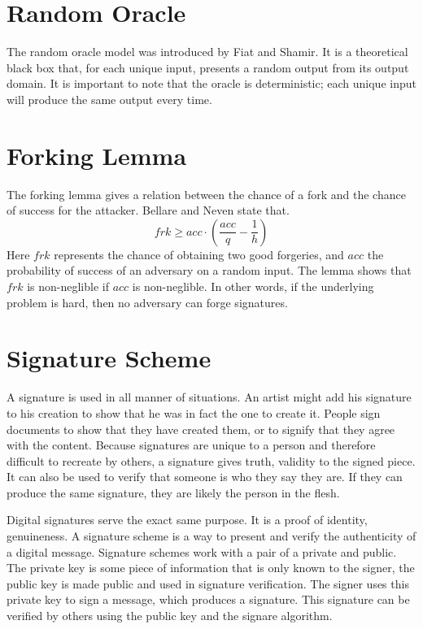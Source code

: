 \section{Random Oracle}
The random oracle model \cite{Oracle} was introduced by Fiat and Shamir. It is a theoretical black box that, for each unique input, presents a random output from its output domain. It is important to note that the oracle is deterministic; each unique input will produce the same output every time.

\section{Forking Lemma}
The forking lemma \cite{Forking} gives a relation between the chance of a fork and the chance of success for the attacker. Bellare and Neven state that.
\begin{equation}
frk\ge acc\cdot(\frac{acc}{q}-\frac{1}{h})
\end{equation}
Here $frk$ represents the chance of obtaining two good forgeries, and $acc$ the probability of success of an adversary on a random input. The lemma shows that $frk$ is non-neglible if $acc$ is non-neglible. In other words, if the underlying problem is hard, then no adversary can forge signatures.

\section{Signature Scheme}
A signature is used in all manner of situations. An artist might add his signature to his creation to show that he was in fact the one to create it. People sign documents to show that they have created them, or to signify that they agree with the content. Because signatures are unique to a person and therefore difficult to recreate by others, a signature gives truth, validity to the signed piece. It can also be used to verify that someone is who they say they are. If they can produce the same signature, they are likely the person in the flesh.

Digital signatures serve the exact same purpose. It is a proof of identity, genuineness. A signature scheme is a way to present and verify the authenticity of a digital message. Signature schemes work with a pair of a private and public. The private key is some piece of information that is only known to the signer, the public key is made public and used in signature verification. The signer uses this private key to sign a message, which produces a signature. This signature can be verified by others using the public key and the signare algorithm.

